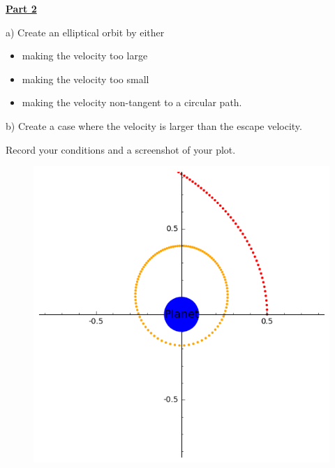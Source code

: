 \underline{\textbf{Part 2}} \par
a) Create an elliptical orbit by either
\begin{itemize}
\item making the velocity too large
\item making the velocity too small
\item making the velocity non-tangent to a circular path.
\end{itemize}
b) Create a case where the velocity is larger than the escape velocity.

Record your conditions and a screenshot of your plot.
%
\begin{figure}[H]
\includegraphics[scale=0.60]{figures/orbits/part2.png}
\end{figure}

